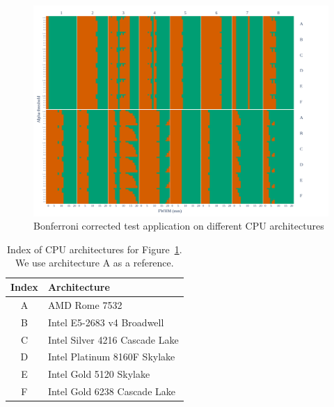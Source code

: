 \documentclass[lettersize,journal]{IEEEtran}
\begin{document}
\begin{figure}
    \centering
    \includegraphics[width=\linewidth]{figures/arch/arch_mct_fwe_bonferroni_.pdf}
    \caption{Bonferroni corrected test application on different CPU architectures}
    \label{fig:arch_bonferroni}
\end{figure}

\begin{table}
    \begin{center}
        \begin{tabular}{c|l}
            Index & Architecture                   \\
            \hline
            A     & AMD Rome 7532                  \\
            B     & Intel E5-2683 v4 Broadwell     \\
            C     & Intel Silver 4216 Cascade Lake \\
            D     & Intel Platinum 8160F Skylake   \\
            E     & Intel Gold 5120 Skylake        \\
            F     & Intel Gold 6238 Cascade Lake
        \end{tabular}
    \end{center}
    \caption{Index of CPU architectures for Figure~\ref{fig:arch_bonferroni}. We use architecture A as a reference.}
    \label{tab:index-arch-map}
\end{table}
\end{document}
